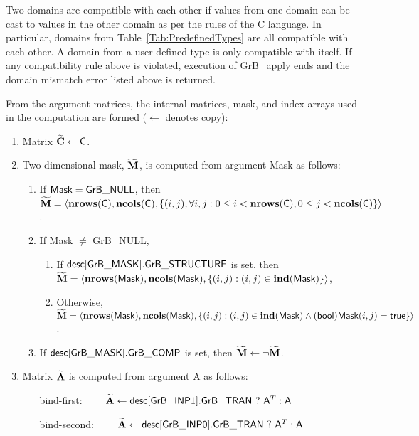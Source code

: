 Two domains are compatible with each other if values from one domain can be cast 
to values in the other domain as per the rules of the C language.
In particular, domains from Table~\ref{Tab:PredefinedTypes} are all compatible 
with each other. A domain from a user-defined type is only compatible with itself.
If any compatibility rule above is violated, execution of {\sf GrB\_apply} ends and 
the domain mismatch error listed above is returned.

From the argument matrices, the internal matrices, mask, and index arrays used in 
the computation are formed ($\leftarrow$ denotes copy):
\begin{enumerate}
	\item Matrix ${\bf \widetilde{C}} \leftarrow {\sf C}$.

	\item Two-dimensional mask, ${\bf \widetilde{M}}$, is computed from 
    argument {\sf Mask} as follows:
	\begin{enumerate}
		\item If ${\sf Mask} = {\sf GrB\_NULL}$, then ${\bf \widetilde{M}} = 
        \langle \bold{nrows}({\sf C}), \bold{ncols}({\sf C}), \{(i,j), 
        \forall i,j : 0 \leq i <  \bold{nrows}({\sf C}), 0 \leq j < 
        \bold{ncols}({\sf C}) \} \rangle$.

		\item If {\sf Mask} $\ne$ {\sf GrB\_NULL},
        \begin{enumerate}
            \item If ${\sf desc[GrB\_MASK].GrB\_STRUCTURE}$ is set, then 
            ${\bf \widetilde{M}} = \langle \bold{nrows}({\sf Mask}), 
            \bold{ncols}({\sf Mask}), \{(i,j) : (i,j) \in \bold{ind}({\sf Mask}) \} \rangle$,
            \item Otherwise, ${\bf \widetilde{M}} = \langle \bold{nrows}({\sf Mask}), 
            \bold{ncols}({\sf Mask}), \\ \{(i,j) : (i,j) \in \bold{ind}({\sf Mask}) \wedge 
            ({\sf bool}){\sf Mask}(i,j) = {\sf true}\} \rangle$.
        \end{enumerate}

		\item	If ${\sf desc[GrB\_MASK].GrB\_COMP}$ is set, then 
        ${\bf \widetilde{M}} \leftarrow \neg {\bf \widetilde{M}}$.
	\end{enumerate}

	\item Matrix ${\bf \widetilde{A}}$ is computed from argument {\sf A} as 
    follows: 
    \begin{itemize}[leftmargin=1.2in]
    \item[bind-first:~~~~]  ${\bf \widetilde{A}}\leftarrow
        {\sf desc[GrB\_INP1].GrB\_TRAN} \ ? \ {\sf A}^T : {\sf A}$
    \item[bind-second:~~~~] ${\bf \widetilde{A}}\leftarrow
        {\sf desc[GrB\_INP0].GrB\_TRAN} \ ? \ {\sf A}^T : {\sf A}$
    \end{itemize}
\end{enumerate}

